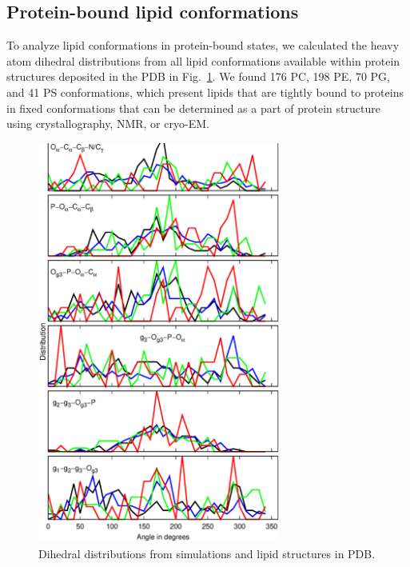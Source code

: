 \documentclass[aps,prl,superscriptaddress,twocolumn]{revtex4}
\begin{document}
\subsection{Protein-bound lipid conformations}

To analyze lipid conformations in protein-bound states,
we calculated the heavy atom dihedral distributions from 
all lipid conformations available within protein structures
deposited in the PDB \cite{berman00} in Fig.~\ref{dihedralsFROMpdb}.
We found 176 PC, 198 PE, 70 PG, and 41 PS conformations, which
present lipids that are tightly bound to proteins in fixed conformations
that can be determined as a part of protein structure using crystallography, NMR, or cryo-EM. 


\begin{figure}[]
  \centering
  \includegraphics[width=8.0cm]{./Figs/DIHEDRALSALLfromPDB.eps}
  \caption{\label{dihedralsFROMpdb}
    Dihedral distributions from simulations and lipid structures in PDB.
  }
\end{figure}
\end{document}
